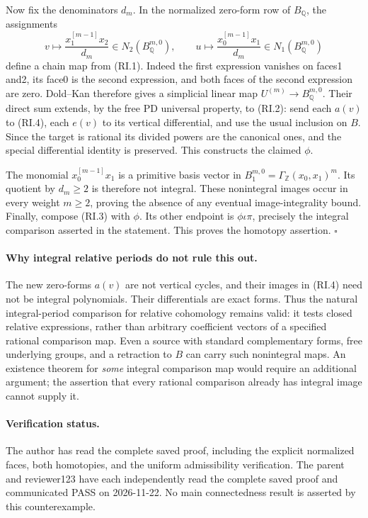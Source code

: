 Now fix the denominators \(d_m\). In the normalized zero-form
row of \(B_{\mathbb Q}\), the assignments
\[
 v\longmapsto \frac{x_1^{[m-1]}x_2}{d_m}
                   \in N_2(B_{\mathbb Q}^{m,0}),
 \qquad
 u\longmapsto \frac{x_0^{[m-1]}x_1}{d_m}
                   \in N_1(B_{\mathbb Q}^{m,0})             \tag{RI.4}
\]
define a chain map from (RI.1). Indeed the first expression
vanishes on faces1 and2, its face0 is the second expression,
and both faces of the second expression are zero. Dold--Kan
therefore gives a simplicial linear map
\(U^{(m)}\to B_{\mathbb Q}^{m,0}\).
Their direct sum extends, by the free PD universal property,
to (RI.2): send each \(a(v)\) to (RI.4), each \(e(v)\) to
its vertical differential, and use the usual inclusion on \(B\).
Since the target is rational its divided powers are the
canonical ones, and the special differential identity is
preserved. This constructs the claimed \(\phi\).

The monomial \(x_0^{[m-1]}x_1\) is a primitive basis vector
in \(B_1^{m,0}=\Gamma_{\mathbb Z}(x_0,x_1)^m\).
Its quotient by \(d_m\geq2\) is therefore not integral.
These nonintegral images occur in every weight \(m\geq2\),
proving the absence of any eventual image-integrality bound.
Finally, compose (RI.3) with \(\phi\). Its other endpoint is
\(\phi\iota\pi\), precisely the integral comparison asserted
in the statement. This proves the homotopy assertion.
\(\square\)

\paragraph{Why integral relative periods do not rule this out.}
The new zero-forms \(a(v)\) are not vertical cycles, and their
images in (RI.4) need not be integral polynomials. Their
differentials are exact forms. Thus the natural integral-period
comparison for relative cohomology remains valid: it tests
closed relative expressions, rather than arbitrary coefficient
vectors of a specified rational comparison map. Even a source
with standard complementary forms, free underlying groups,
and a retraction to \(B\) can carry such nonintegral maps.
An existence theorem for \emph{some} integral comparison map
would require an additional argument; the assertion that every
rational comparison already has integral image cannot supply it.

\paragraph{Verification status.}
The author has read the complete saved proof, including the
explicit normalized faces, both homotopies, and the uniform
admissibility verification. The parent and reviewer123 have each
independently read the complete saved proof and communicated PASS
on 2026-11-22. No main connectedness result is asserted by this
counterexample.
